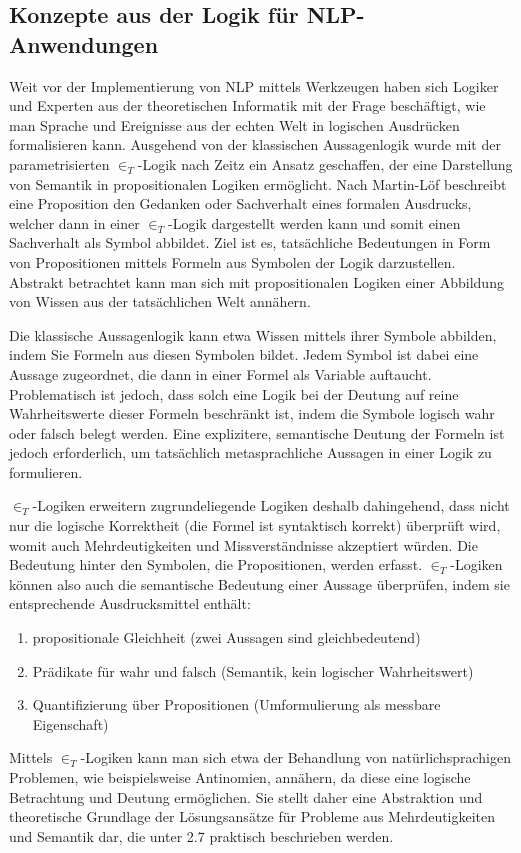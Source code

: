 \documentclass[12pt]{report}
\begin{document}
\subsection{Konzepte aus der Logik für NLP-Anwendungen}
Weit vor der Implementierung von NLP mittels Werkzeugen haben sich Logiker und Experten aus der theoretischen Informatik mit der Frage beschäftigt, wie man Sprache und Ereignisse aus der echten Welt in logischen Ausdrücken formalisieren kann. Ausgehend von der klassischen Aussagenlogik wurde mit der parametrisierten $\in_T$-Logik nach Zeitz \cite{ze00} ein Ansatz geschaffen, der eine Darstellung von Semantik in propositionalen Logiken ermöglicht. Nach Martin-Löf \cite{ml96} beschreibt eine Proposition den \glqq  Gedanken oder Sachverhalt eines formalen Ausdrucks\grqq{}, welcher dann in einer $\in_T$-Logik dargestellt werden kann und somit einen Sachverhalt als Symbol abbildet. Ziel ist es, tatsächliche Bedeutungen in Form von Propositionen mittels Formeln aus Symbolen der Logik darzustellen. Abstrakt betrachtet kann man sich mit propositionalen Logiken einer Abbildung von Wissen aus der tatsächlichen Welt annähern. 

Die klassische Aussagenlogik kann etwa Wissen mittels ihrer Symbole abbilden, indem Sie Formeln aus diesen Symbolen bildet. Jedem Symbol ist dabei eine Aussage zugeordnet, die dann in einer Formel als Variable auftaucht. Problematisch ist jedoch, dass solch eine Logik bei der Deutung auf reine Wahrheitswerte dieser Formeln beschränkt ist, indem die Symbole logisch wahr oder falsch belegt werden. Eine explizitere, semantische Deutung der Formeln ist jedoch erforderlich, um tatsächlich metasprachliche Aussagen in einer Logik zu formulieren. 

$\in_T$-Logiken erweitern zugrundeliegende Logiken deshalb dahingehend, dass nicht nur die logische Korrektheit (die Formel ist syntaktisch korrekt) überprüft wird, womit auch Mehrdeutigkeiten und Missverständnisse akzeptiert würden. Die Bedeutung hinter den Symbolen, die Propositionen, werden erfasst. $\in_T$-Logiken können also auch die semantische Bedeutung einer Aussage überprüfen, indem sie entsprechende Ausdrucksmittel enthält:
\begin{enumerate}
\item propositionale Gleichheit (zwei Aussagen sind gleichbedeutend)
\item Prädikate für wahr und falsch (Semantik, kein logischer Wahrheitswert)
\item Quantifizierung über Propositionen (Umformulierung als messbare Eigenschaft)
\end{enumerate}
Mittels $\in_T$-Logiken kann man sich etwa der Behandlung von natürlichsprachigen Problemen, wie beispielsweise Antinomien, annähern, da diese eine logische Betrachtung und Deutung ermöglichen. Sie stellt daher eine Abstraktion und theoretische Grundlage der Lösungsansätze für Probleme aus Mehrdeutigkeiten und Semantik dar, die unter 2.7 praktisch beschrieben werden.
\end{document}
